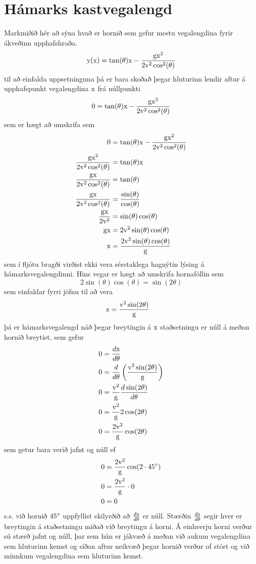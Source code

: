 \section{Hámarks kastvegalengd}
Markmiðið hér að sýna hvað er hornið sem gefur mestu vegalengdina fyrir ákveðinn
upphafshraða.
\[
	\text{y}(\text{x}) = \tan(\theta) \text{x}
		- \frac{\textrm{g} \text{x}^2}{2\textrm{v}^2 \cos^2(\theta)}
\]
til að einfalda uppsetninguna þá er bara skoðað þegar hluturinn lendir aftur
á upphafspunkt vegalengdina $\text{x}$ frá núllpunkti
\[
	0 = \tan(\theta) \text{x}
		- \frac{\textrm{g} \text{x}^2}{2\textrm{v}^2 \cos^2(\theta)}
\]
sem er hægt að umskrifa sem
\begin{align*}
	0 &= \tan(\theta) \text{x}
		- \frac{\textrm{g} \text{x}^2}{2\textrm{v}^2 \cos^2(\theta)} \\
	\frac{\textrm{g} \text{x}^2}{2\textrm{v}^2 \cos^2(\theta)} 
		&= \tan(\theta) \text{x} \\
	\frac{\textrm{g} \text{x}}{2\textrm{v}^2 \cos^2(\theta)} 
		&= \tan(\theta)  \\
	\frac{\textrm{g} \text{x}}{2\textrm{v}^2 \cos^2(\theta)} 
		&= \frac{\sin(\theta)}{\cos(\theta)}  \\
	\frac{\textrm{g} \text{x}}{2\textrm{v}^2} 
		&= \sin(\theta)\cos(\theta)  \\
	\textrm{g} \text{x}
		&= 2\textrm{v}^2\sin(\theta)\cos(\theta)  \\
	\text{x}
		&= \frac{2\textrm{v}^2\sin(\theta)\cos(\theta)}{\textrm{g}}
\end{align*}
sem í fljótu bragði virðist ekki vera sérstaklega hagnýtin lýsing á hámarksvegalengdinni.
Hins vegar er hægt að umskrifa hornaföllin sem
\[
	2\sin(\theta)\cos(\theta) = \sin(2\theta)
\]
sem einfaldar fyrri jöfnu til að vera
\begin{align}
	\text{x}
		&= \frac{\textrm{v}^2 \sin(2\theta)}{\textrm{g}}
\end{align}
þá er hámarksvegalengd náð þegar breytingin á $\text{x}$ staðsetningu er núll á meðan
hornið breytist, sem gefur
\begin{align*}
	0 
		&= \frac{ d\text{x} }{d\theta} \\
	0
		&= \frac{ d }{d\theta} \left(\frac{\textrm{v}^2 \sin(2\theta)}{\textrm{g}} \right) \\
	0
		&= \frac{\textrm{v}^2}{\textrm{g}} \frac{ d\sin(2\theta) }{d\theta} \\
	0
		&= \frac{\textrm{v}^2}{\textrm{g}} 2\cos(2\theta)\\
	0
		&= \frac{2\textrm{v}^2}{\textrm{g}} \cos(2\theta)
\end{align*}
sem getur bara verið jafnt og núll ef
\begin{align*}
	0
		&= \frac{2\textrm{v}^2}{\textrm{g}} \cos(2 \cdot 45^{\circ})\\
	0
		&= \frac{2\textrm{v}^2}{\textrm{g}}  \cdot 0\\
	0
		&= 0\\
\end{align*}
s.s. við hornið $45^{\circ}$ uppfyllist skilyrðið að $\frac{ d\text{x} }{d\theta}$ er núll.
Stærðin $\frac{ d\text{x} }{d\theta}$ segir hver er breytingin á staðsetningu miðað
við breytingu á horni. Á einhverju horni verður sú stærð jafnt og núll, þar sem
hún er jákvæð á meðan við aukum vegalengdina sem hluturinn kemst og síðan aftur
neikvæð þegar hornið verður of stórt og við minnkum vegalengdina sem hluturinn
kemst.